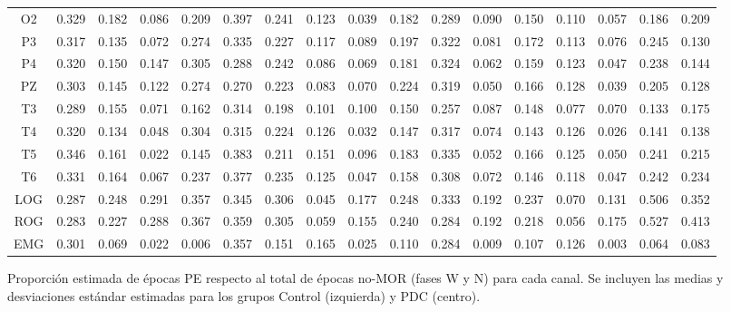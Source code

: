 \begin{SidewaysFigure}
\begin{tabular}{c||ccccc|cc||cccc|cc||ccc}
 O2 & 0.329    & 0.182    & 0.086    & 0.209    & 0.397    & 0.241    & 0.123    & 0.039    & 0.182    & 0.289    & 0.090    & 0.150    & 0.110    & 0.057    & 0.186    & 0.209     \\
 P3 & 0.317    & 0.135    & 0.072    & 0.274    & 0.335    & 0.227    & 0.117    & 0.089    & 0.197    & 0.322    & 0.081    & 0.172    & 0.113    & 0.076    & 0.245    & 0.130     \\
 P4 & 0.320    & 0.150    & 0.147    & 0.305    & 0.288    & 0.242    & 0.086    & 0.069    & 0.181    & 0.324    & 0.062    & 0.159    & 0.123    & 0.047    & 0.238    & 0.144     \\
 PZ & 0.303    & 0.145    & 0.122    & 0.274    & 0.270    & 0.223    & 0.083    & 0.070    & 0.224    & 0.319    & 0.050    & 0.166    & 0.128    & 0.039    & 0.205    & 0.128     \\
 T3 & 0.289    & 0.155    & 0.071    & 0.162    & 0.314    & 0.198    & 0.101    & 0.100    & 0.150    & 0.257    & 0.087    & 0.148    & 0.077    & 0.070    & 0.133    & 0.175     \\
 T4 & 0.320    & 0.134    & 0.048    & 0.304    & 0.315    & 0.224    & 0.126    & 0.032    & 0.147    & 0.317    & 0.074    & 0.143    & 0.126    & 0.026    & 0.141    & 0.138     \\
 T5 & 0.346    & 0.161    & 0.022    & 0.145    & 0.383    & 0.211    & 0.151    & 0.096    & 0.183    & 0.335    & 0.052    & 0.166    & 0.125    & 0.050    & 0.241    & 0.215     \\
 T6 & 0.331    & 0.164    & 0.067    & 0.237    & 0.377    & 0.235    & 0.125    & 0.047    & 0.158    & 0.308    & 0.072    & 0.146    & 0.118    & 0.047    & 0.242    & 0.234     \\
 LOG & 0.287    & 0.248    & 0.291    & 0.357    & 0.345    & 0.306    & 0.045    & 0.177    & 0.248    & 0.333    & 0.192    & 0.237    & 0.070    & 0.131    & 0.506    & 0.352     \\
 ROG & 0.283    & 0.227    & 0.288    & 0.367    & 0.359    & 0.305    & 0.059    & 0.155    & 0.240    & 0.284    & 0.192    & 0.218    & 0.056    & 0.175    & 0.527    & 0.413     \\
 EMG & 0.301    & 0.069    & 0.022    & 0.006    & 0.357    & 0.151    & 0.165    & 0.025    & 0.110    & 0.284    & 0.009    & 0.107    & 0.126    & 0.003    & 0.064    & 0.083    
\end{tabular}
\caption{Proporci\'on estimada de \'epocas PE respecto al total de \'epocas no-MOR 
(fases W y N) para cada
canal. Se incluyen las medias y desviaciones est\'andar estimadas para los grupos 
Control (izquierda) y PDC (centro).}
\label{gpos_nmor}
\end{SidewaysFigure}

